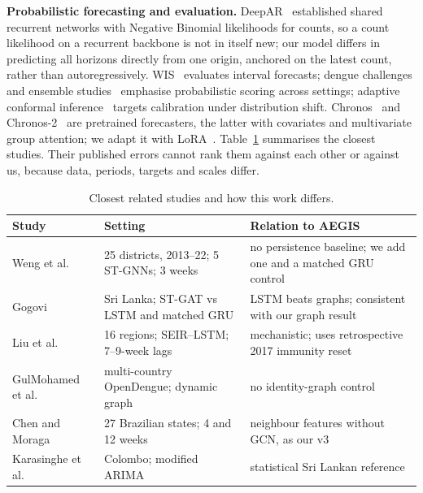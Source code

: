 \textbf{Probabilistic forecasting and evaluation.} DeepAR~\cite{salinas2020deepar} established shared recurrent networks with Negative Binomial likelihoods for counts, so a count likelihood on a recurrent backbone is not in itself new; our model differs in predicting all horizons directly from one origin, anchored on the latest count, rather than autoregressively. WIS~\cite{bracher2021evaluating} evaluates interval forecasts; dengue challenges and ensemble studies~\cite{johansson2019open,mosqlimate2026sprint,colongonzalez2021probabilistic,ensemble2025global} emphasise probabilistic scoring across settings; adaptive conformal inference~\cite{gibbs2021adaptive} targets calibration under distribution shift. Chronos~\cite{ansari2024chronos,chronosbolt2024card} and Chronos-2~\cite{ansari2025chronos2} are pretrained forecasters, the latter with covariates and multivariate group attention; we adapt it with LoRA~\cite{hu2022lora}. Table~\ref{tab:related} summarises the closest studies. Their published errors cannot rank them against each other or against us, because data, periods, targets and scales differ.

\begin{table}[t]
\centering
\caption{Closest related studies and how this work differs.}
\label{tab:related}
\small
\setlength{\tabcolsep}{3pt}
\begin{tabular}{p{2.1cm}p{2.7cm}p{3.1cm}}
\toprule
\textbf{Study} & \textbf{Setting} & \textbf{Relation to AEGIS} \\
\midrule
Weng et al.~\cite{weng2024graph} & 25 districts, 2013--22; 5 ST-GNNs; 3 weeks & no persistence baseline; we add one and a matched GRU control \\
Gogovi~\cite{gogovi2026spatial} & Sri Lanka; ST-GAT vs LSTM and matched GRU & LSTM beats graphs; consistent with our graph result \\
Liu et al.~\cite{liu2025explainable} & 16 regions; SEIR--LSTM; 7--9-week lags & mechanistic; uses retrospective 2017 immunity reset \\
GulMohamed et al.~\cite{gulmohamed2026denguegnn} & multi-country OpenDengue; dynamic graph & no identity-graph control \\
Chen and Moraga~\cite{chen2025climatespatial} & 27 Brazilian states; 4 and 12 weeks & neighbour features without GCN, as our v3 \\
Karasinghe et al.~\cite{karasinghe2024weekly} & Colombo; modified ARIMA & statistical Sri Lankan reference \\
\bottomrule
\end{tabular}
\end{table}

